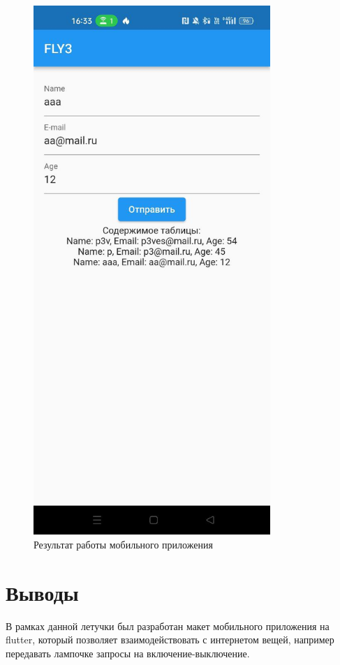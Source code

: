 \documentclass[a4paper, 14pt]{extarticle}
\begin{document}
\begin{figure}[H]
\centering
\includegraphics[width=0.8\textwidth]{images/res1.jpg}
\caption{Результат работы мобильного приложения}
\label{fig:img1}
\end{figure}



\section{Выводы}
В рамках данной летучки был разработан макет мобильного приложения на flutter, который позволяет взаимодействовать с интернетом вещей, например передавать лампочке запросы на включение-выключение.
\end{document}
